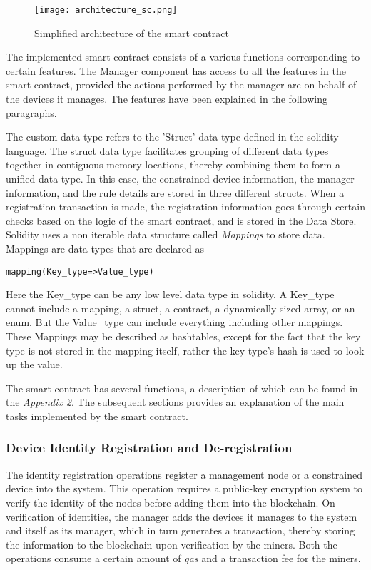 \documentclass[english]{tktltiki}
\begin{document}
\begin{figure}[H]
\begin{center}
\texttt{[image: architecture\_sc.png]}
\caption{Simplified architecture of the smart contract}
\label{smart contract}
\end{center}
\end{figure}

The implemented smart contract consists of a various functions corresponding to certain features. The Manager component has access to all the features in the smart contract, provided the actions performed by the manager are on behalf of the devices it manages. The features have been explained in the following paragraphs.

The custom data type refers to the 'Struct' data type defined in the solidity language. The struct data type facilitates grouping of different data types together in contiguous memory locations, thereby combining them to form a unified data type. In this case, the constrained device information, the manager information, and the rule details are stored in three different structs. When a registration transaction is made, the registration information goes through certain checks based on the logic of the smart contract, and is stored in the Data Store. Solidity uses a non iterable data structure called \textit{Mappings} to store data. Mappings are data types that are declared as

\begin{verbatim}
mapping(Key_type=>Value_type)
\end{verbatim}


Here the Key\_type can be any low level data type in solidity. A Key\_type cannot include a mapping, a struct, a contract, a dynamically sized array, or an enum. But the Value\_type can include everything including other mappings. These Mappings may be described as hashtables, except for the fact that the key type is not stored in the mapping itself, rather the key type's hash is used to look up the value.

The smart contract has several functions, a description of which can be found in the \textit{Appendix 2}. The subsequent sections provides an explanation of the main tasks implemented by the smart contract.

\subsubsection*{Device Identity Registration and De-registration}
The identity registration operations register a management node or a constrained device into the system. This operation requires a public-key encryption system to verify the identity of the nodes before adding them into the blockchain. On verification of identities, the manager adds the devices it manages to the system and itself as its manager, which in turn generates a transaction, thereby storing the information to the blockchain upon verification by the miners. Both the operations consume a certain amount of \textit{gas} and a transaction fee for the miners. 
\end{document}

